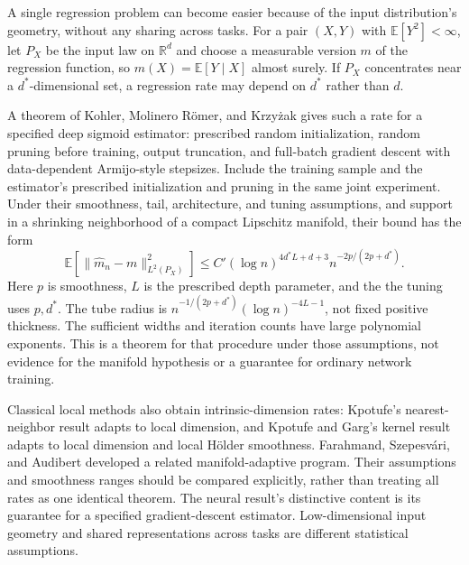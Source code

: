 \documentclass[11pt,twoside]{article}
\newcommand{\E}{\mathbb E}
\newcommand{\R}{\mathbb R}
\theoremstyle{definition}
\theoremstyle{remark}
\begin{document}
A single regression problem can become easier because of the input
distribution's geometry, without any sharing across tasks.
For a pair $(X,Y)$ with $\E[Y^2]<\infty$, let $P_X$ be the input law on
$\R^d$ and choose a measurable version $m$ of the regression function, so
$m(X)=\E[Y\mid X]$ almost surely.
If $P_X$ concentrates near a $d^\ast$-dimensional set, a regression rate may
depend on $d^\ast$ rather than $d$.

A theorem of Kohler, Molinero R\"omer, and Krzy\.{z}ak gives such a rate for a
specified deep sigmoid estimator: prescribed random initialization, random
pruning before training, output truncation, and full-batch gradient descent
with data-dependent Armijo-style stepsizes. Include the training sample and
the estimator's prescribed initialization and pruning in the same joint
experiment. Under their smoothness, tail,
architecture, and tuning assumptions, and support in a shrinking neighborhood
of a compact Lipschitz manifold, their bound has the form
\[
 \E[\|\widehat m_n-m\|_{L^2(P_X)}^2]
 \le C'(\log n)^{4d^\ast L+d+3}n^{-2p/(2p+d^\ast)}.
\]
Here $p$ is smoothness, $L$ is the prescribed depth parameter, and the
the tuning uses $p,d^\ast$. The tube radius is
$n^{-1/(2p+d^\ast)}(\log n)^{-4L-1}$, not fixed positive thickness.
The sufficient widths and iteration counts have large polynomial exponents.
This is a theorem for that procedure under those assumptions, not evidence
for the manifold hypothesis or a guarantee for ordinary network training.

Classical local methods also obtain intrinsic-dimension rates:
Kpotufe's nearest-neighbor result adapts to local dimension, and Kpotufe and
Garg's kernel result adapts to local dimension and local H\"older smoothness.
Farahmand, Szepesv\'ari, and Audibert developed a related manifold-adaptive
program. Their assumptions and smoothness ranges should be compared
explicitly, rather than treating all rates as one identical theorem.
The neural result's distinctive content is its guarantee for a specified
gradient-descent estimator. Low-dimensional input geometry and shared
representations across tasks are different statistical assumptions.
\end{document}
